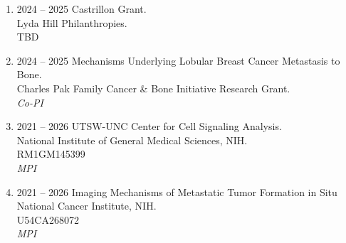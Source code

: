 \begin{enumerate}
[leftmargin=!,
labelindent=0pt,
itemindent=-66pt,
label=\textbullet]

\item 2024 -- 2025 
\hspace{8pt}
Castrillon Grant. \\
Lyda Hill Philanthropies. \\
TBD \\ 

\item 2024 -- 2025 
\hspace{8pt}
Mechanisms Underlying Lobular Breast Cancer Metastasis to Bone. \\
Charles Pak Family Cancer \& Bone Initiative Research Grant. \\
{\it Co-PI}

\item 2021 -- 2026 
\hspace{8pt}
UTSW-UNC Center for Cell Signaling Analysis. \\
National Institute of General Medical Sciences, NIH. \\
RM1GM145399 \\ 
{\it MPI}

\item 2021 -- 2026 
\hspace{8pt}
Imaging Mechanisms of Metastatic Tumor Formation in Situ \\
National Cancer Institute, NIH. \\
U54CA268072 \\ 
{\it MPI}

\end{enumerate}

